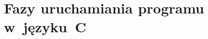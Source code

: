\documentclass[10pt,t]{beamer}
\begin{document}
\begin{frame}






\end{frame}







\section{Fazy uruchamiania programu w~języku~C}
\end{document}
